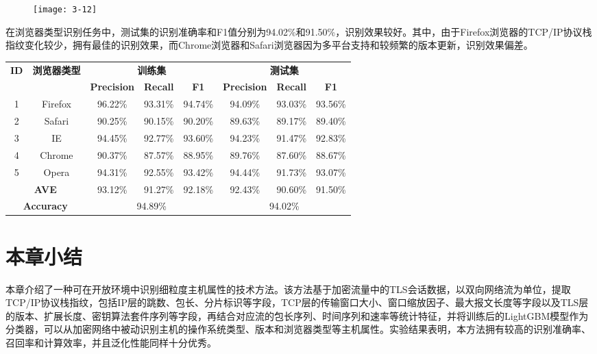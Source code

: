 \begin{figure}[!h]
    \centering
    \texttt{[image: 3-12]}
    \label{fig:3-12}
\end{figure}

\vbox{}
在浏览器类型识别任务中，测试集的识别准确率和F1值分别为94.02\%和91.50\%，识别效果较好。其中，由于Firefox浏览器的TCP/IP协议栈指纹变化较少，拥有最佳的识别效果，而Chrome浏览器和Safari浏览器因为多平台支持和较频繁的版本更新，识别效果偏差。

\begin{table}[!htbp]
    \centering
    \footnotesize
    \setlength{\tabcolsep}{8pt}
    \renewcommand{\arraystretch}{1}
\begin{tabular}{|c|c|c|c|c|c|c|c|}
\hline
\multirow{2}{*}{ \textbf{ID}} & \multirow{2}{*}{ \textbf{浏览器类型}} & \multicolumn{3}{c|}{ \textbf{训练集}} & \multicolumn{3}{c|}{ \textbf{测试集}} \\ \cline{3-8} 
 &  &  \textbf{Precision} &  \textbf{Recall} &  \textbf{F1} & \textbf{Precision} &  \textbf{Recall} &  \textbf{F1} \\ \hline
1 & Firefox & 96.22\% & 93.31\% & 94.74\% & 94.09\% & 93.03\% & 93.56\%\\ \hline
2 & Safari & 90.25\% & 90.15\% & 90.20\% & 89.63\% & 89.17\% & 89.40\%\\ \hline
3 & IE & 94.45\% & 92.77\% & 93.60\% & 94.23\% & 91.47\% & 92.83\% \\ \hline
4 & Chrome & 90.37\% & 87.57\% & 88.95\% & 89.76\% & 87.60\% & 88.67\%\\ \hline
5 & Opera & 94.31\% & 92.55\% & 93.42\% & 94.44\% & 91.73\% & 93.07\%\\ \hline
\multicolumn{2}{|c|}{\textbf{AVE}} & 93.12\% & 91.27\% & 92.18\% & 92.43\% & 90.60\% & 91.50\%\\ \hline
\multicolumn{2}{|c|}{\textbf{Accuracy}} & \multicolumn{3}{c|}{94.89\%} & \multicolumn{3}{c|}{94.02\%} \\ \hline
\end{tabular}
\end{table}


\section{本章小结}

本章介绍了一种可在开放环境中识别细粒度主机属性的技术方法。该方法基于加密流量中的TLS会话数据，以双向网络流为单位，提取TCP/IP协议栈指纹，包括IP层的跳数、包长、分片标识等字段，TCP层的传输窗口大小、窗口缩放因子、最大报文长度等字段以及TLS层的版本、扩展长度、密钥算法套件序列等字段，再结合对应流的包长序列、时间序列和速率等统计特征，并将训练后的LightGBM模型作为分类器，可以从加密网络中被动识别主机的操作系统类型、版本和浏览器类型等主机属性。实验结果表明，本方法拥有较高的识别准确率、召回率和计算效率，并且泛化性能同样十分优秀。
